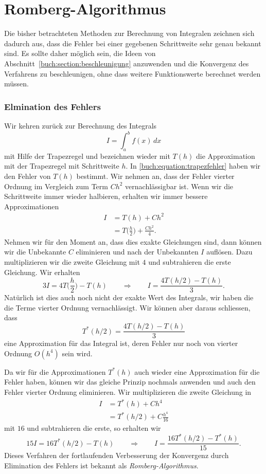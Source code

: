 %
%
%
\section{Romberg-Algorithmus
\label{buch:section:romberg}}
Die bisher betrachteten Methoden zur Berechnung von Integralen zeichnen
sich dadurch aus, dass die Fehler bei einer gegebenen Schrittweite 
sehr genau bekannt sind.
Es sollte daher möglich sein, die Ideen von
Abschnitt~\ref{buch:section:beschleunigung}
anzuwenden und die Konvergenz des Verfahrens zu beschleunigen, ohne
dass weitere Funktionswerte berechnet werden müssen.

\subsubsection{Elmination des Fehlers}
Wir kehren zurück zur Berechnung des Integrals
\[
I=\int_a^b f(x)\,dx
\]
mit Hilfe der Trapezregel und bezeichnen wieder mit $T(h)$
die Approximation mit der Trapezregel mit Schrittweite $h$.
In \eqref{buch:equation:trapezfehler} haben wir den Fehler von $T(h)$
bestimmt.
Wir nehmen an, dass der Fehler vierter Ordnung im Vergleich zum Term
$Ch^2$ vernachlässigbar ist.
Wenn wir die Schrittweite immer wieder halbieren, erhalten wir immer bessere
Approximationen
\begin{align*}
I&=T(h) + Ch^2
\\
&=T\biggl(\frac{h}2\biggr) + \frac{Ch^2}{4}.
\end{align*}
Nehmen wir für den Moment an, dass dies exakte Gleichungen sind, dann
können wir die Unbekannte $C$ eliminieren und nach der Unbekannten $I$
auflösen.
Dazu multiplizieren wir die zweite Gleichung mit $4$ und subtrahieren
die erste Gleichung.
Wir erhalten
\[
3I= 4T\biggl(\frac{h}2\biggr) - T(h)
\qquad\Rightarrow\qquad
I= \frac{4T(h/2) - T(h)}{3}.
\]
Natürlich ist dies auch noch nicht der exakte Wert des Integrals,
wir haben die die Terme vierter Ordnung vernachlässigt.
Wir können aber daraus schliessen, dass 
\[
T^*(h/2) = \frac{4T(h/2)-T(h)}{3}
\]
eine Approximation für das Integral ist, deren Fehler nur noch
von vierter Ordnung $O(h^4)$ sein wird.

Da wir für die Approximationen $T^*(h)$ auch wieder eine Approximation
für die Fehler haben, können wir das gleiche Prinzip nochmals anwenden
und auch den Fehler vierter Ordnung eliminieren.
Wir multiplizieren die zweite Gleichung in
\begin{align*}
I&=T^*(h) + Ch^4 \\
 &=T^*(h/2) + C\frac{h^4}{16}
\end{align*}
mit $16$ und subtrahieren die erste, so erhalten wir
\[
15I = 16T^*(h/2)-T(h)
\qquad\Rightarrow\qquad
I = \frac{16T^*(h/2)-T^*(h)}{15}.
\]
Dieses Verfahren der fortlaufenden Verbesserung der Konvergenz durch
Elimination des Fehlers ist bekannt als {\em Romberg-Algorithmus}.


